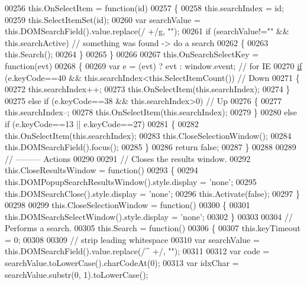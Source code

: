 \begin{DoxyCode}
00256   this.OnSelectItem = \textcolor{keyword}{function}(id)
00257   \{
00258     this.searchIndex = id;
00259     this.SelectItemSet(\textcolor{keywordtype}{id});
00260     var searchValue = this.DOMSearchField().value.replace(/ +/g, \textcolor{stringliteral}{""});
00261     \textcolor{keywordflow}{if} (searchValue!=\textcolor{stringliteral}{""} && this.searchActive) \textcolor{comment}{// something was found -> do a search}
00262     \{
00263       this.Search();
00264     \}
00265   \}
00266 
00267   this.OnSearchSelectKey = \textcolor{keyword}{function}(evt)
00268   \{
00269     var e = (evt) ? evt : window.event; \textcolor{comment}{// for IE}
00270     \hyperlink{jquery_8js_a9db6d45a025ad692282fe23e69eeba43}{if} (e.keyCode==40 && \textcolor{keyword}{this}.searchIndex<\textcolor{keyword}{this}.SelectItemCount()) \textcolor{comment}{// Down}
00271     \{
00272       this.searchIndex++;
00273       this.OnSelectItem(this.searchIndex);
00274     \}
00275     \textcolor{keywordflow}{else} \textcolor{keywordflow}{if} (e.keyCode==38 && \textcolor{keyword}{this}.searchIndex>0) \textcolor{comment}{// Up}
00276     \{
00277       this.searchIndex--;
00278       this.OnSelectItem(this.searchIndex);
00279     \}
00280     \textcolor{keywordflow}{else} \textcolor{keywordflow}{if} (e.keyCode==13 || e.keyCode==27)
00281     \{
00282       this.OnSelectItem(this.searchIndex);
00283       this.CloseSelectionWindow();
00284       this.DOMSearchField().focus();
00285     \}
00286     \textcolor{keywordflow}{return} \textcolor{keyword}{false};
00287   \}
00288 
00289   \textcolor{comment}{// --------- Actions}
00290 
00291   \textcolor{comment}{// Closes the results window.}
00292   this.CloseResultsWindow = \textcolor{keyword}{function}()
00293   \{
00294     this.DOMPopupSearchResultsWindow().style.display = \textcolor{stringliteral}{'none'};
00295     this.DOMSearchClose().style.display = \textcolor{stringliteral}{'none'};
00296     this.Activate(\textcolor{keyword}{false});
00297   \}
00298 
00299   this.CloseSelectionWindow = \textcolor{keyword}{function}()
00300   \{
00301     this.DOMSearchSelectWindow().style.display = \textcolor{stringliteral}{'none'};
00302   \}
00303 
00304   \textcolor{comment}{// Performs a search.}
00305   this.Search = \textcolor{keyword}{function}()
00306   \{
00307     this.keyTimeout = 0;
00308 
00309     \textcolor{comment}{// strip leading whitespace}
00310     var searchValue = this.DOMSearchField().value.replace(/^ +/, \textcolor{stringliteral}{""});
00311 
00312     var code = searchValue.toLowerCase().charCodeAt(0);
00313     var idxChar = searchValue.substr(0, 1).toLowerCase();

\end{DoxyCode}
